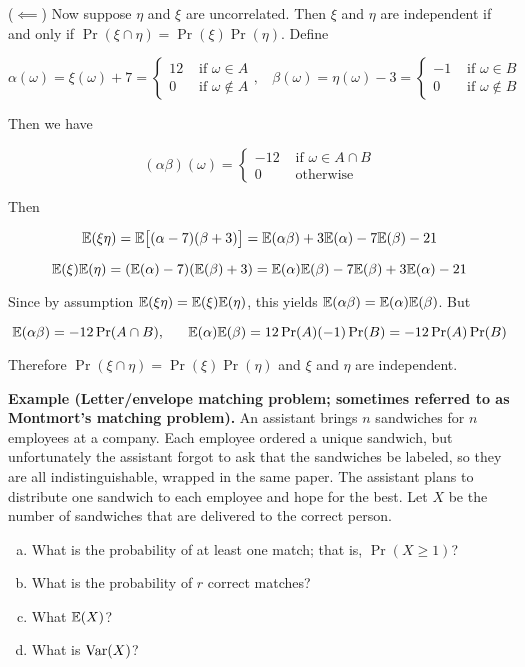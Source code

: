 (\(\impliedby\)) Now suppose \(\eta\) and \(\xi\) are uncorrelated. Then \(\xi\) and \(\eta\) are independent if and only if \(\Pr(\xi \cap \eta) = \Pr(\xi) \Pr(\eta)\). Define

\[
\alpha(\omega) =  \xi(\omega) + 7 = \begin{cases} 
      12 & \text{ if } \omega \in A \\
      0 &  \text{ if } \omega \notin A 
   \end{cases}, \ \ \ \ \beta(\omega) =  \eta(\omega) - 3 = \begin{cases} 
      -1 & \text{ if } \omega \in B \\
      0 &  \text{ if } \omega \notin B 
   \end{cases}
\]

Then we have

\[
(\alpha \beta)(\omega) = \begin{cases} 
      -12 & \text{ if } \omega \in A \cap B \\
      0 &  \text{ otherwise} 
   \end{cases}
\]

Then

\[
\E(\xi \eta) = \E\big[ (\alpha - 7)(\beta + 3)\big] = \E(\alpha \beta) + 3 \E(\alpha) - 7 \E(\beta) - 21
\]

\[
\E(\xi) \E(\eta) = (\E(\alpha) - 7) (\E(\beta) + 3) = \E(\alpha) \E(\beta) - 7 \E(\beta) + 3 \E(\alpha) - 21
\]

Since by assumption \( \E(\xi \eta)  = \E(\xi) \E(\eta) \), this yields \(\E(\alpha \beta) = \E(\alpha) \E(\beta) \). But

\[
\E(\alpha \beta) = -12 \Pr(A \cap B), \ \ \ \ \ \E(\alpha) \E(\beta) = 12 \Pr(A) (-1) \Pr(B) = -12\Pr(A)\Pr(B)
\]

Therefore \(\Pr(\xi \cap \eta) = \Pr(\xi) \Pr(\eta)\) and \(\xi\) and \(\eta\) are independent.

\textbf{Example (Letter/envelope matching problem; sometimes referred to as Montmort's matching problem).} An assistant brings \(n\) sandwiches for \(n\) employees at a company. Each employee ordered a unique sandwich, but unfortunately the assistant forgot to ask that the sandwiches be labeled, so they are all indistinguishable, wrapped in the same paper. The assistant plans to distribute one sandwich to each employee and hope for the best. Let \(X\) be the number of sandwiches that are delivered to the correct person.

\begin{enumerate}[(a)]

\item What is the probability of at least one match; that is, \(\Pr(X \geq 1)\)?

\item What is the probability of \(r\) correct matches?

\item What \(\E(X)\)?

\item What is \(\Var(X)\)?

\end{enumerate}

